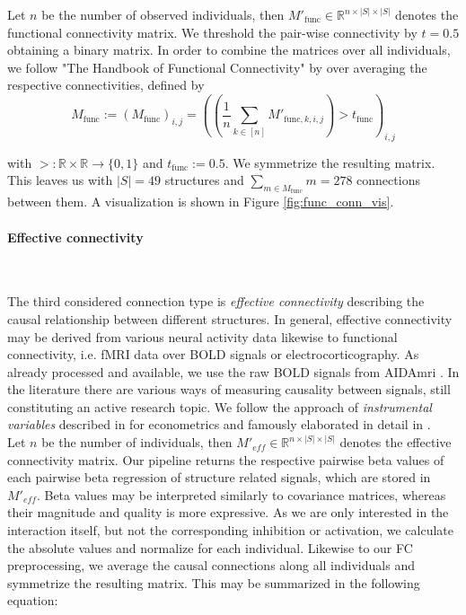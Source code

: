 \documentclass[]{article}
\renewcommand{\cite}{\citep}
\begin{document}
Let $n$ be the number of observed individuals, then $M'_{\text{func}}\in\mathbb{R}^{n\times|S|\times|S|}$ denotes the functional connectivity matrix. We threshold the pair-wise connectivity by $t=0.5$ obtaining a binary matrix. In order to combine the matrices over all individuals, we follow "The Handbook of Functional Connectivity" \cite{nieto2020handbook} by over averaging the respective connectivities, defined by 
\begin{equation}
	M_{\text{func}}:= \left(M_{\text{func}}\right)_{i,j} = \left(\left(\frac{1}{n}\sum_{k\in [n]}M'_{\text{func}, k,i,j}\right) > t_{\text{func}}\right)_{i,j}
\end{equation}

with $>:\mathbb{R}\times\mathbb{R}\rightarrow \{0,1\} $ and $t_{\text{func}}:=0.5$. We symmetrize the resulting matrix. This leaves us with $|S|=49$ structures and $\sum_{m\in M_{\text{func}} }m=278$ connections between them. A visualization is shown in Figure \ref{fig:func_conn_vis}.


\paragraph{Effective connectivity} \mbox{}\\
\label{sec:eff_conn}

The third considered connection type is \textit{effective connectivity} describing the causal relationship between different structures. In general, effective connectivity may be derived from various neural activity data likewise to functional connectivity, i.e. fMRI data over BOLD signals or electrocorticography. As already processed and available, we use the raw BOLD signals from AIDAmri \cite{AIDAmri2019}. 
In the literature there are various ways of measuring causality between signals, still constituting an active research topic. We follow the approach of \textit{instrumental variables} described in \citet{angrist2009mostly} for econometrics and famously elaborated in detail in \citet{pearl2009causality}.\\

Let $n$ be the number of individuals, then $M'_{eff}\in\mathbb{R}^{n\times|S|\times|S|}$ denotes the effective connectivity matrix. Our pipeline returns the respective pairwise beta values of each pairwise beta regression of structure related signals, which are stored in $M'_{eff}$. Beta values may be interpreted similarly to covariance matrices, whereas their magnitude and quality is more expressive. As we are only interested in the interaction itself, but not the corresponding inhibition or activation, we calculate the absolute values and normalize for each individual. Likewise to our FC preprocessing, we average the causal connections along all individuals and symmetrize the resulting matrix. This may be summarized in the following equation:
\end{document}
